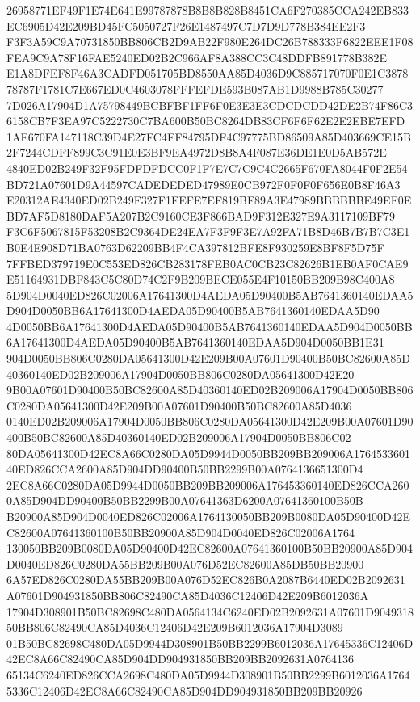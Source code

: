 \documentclass[UTF8,fontset=fandol,zihao=-4,a4paper]{ctexart}
\begin{document}
{{26958771EF49F1E74E641E99787878B8B8B828B8451CA6F270385CCA242EB833EC6905D42E209BD45FC5050727F26E1487497C7D7D9D778B384EE2F3
F3F3A59C9A70731850BB806CB2D9AB22F980E264DC26B788333F6822EEE1F08FEA9C9A78F16FAE5240ED02B2C966AF8A388CC3C48DDFB891778B382E
E1A8DFEF8F46A3CADFD051705BD8550AA85D4036D9C885717070F0E1C387878787F1781C7E667ED0C4603078FFFEFDE593B087AB1D9988B785C30277
7D026A17904D1A75798449BCBFBF1FF6F0E3E3E3CDCDCDD42DE2B74F86C36158CB7F3EA97C5222730C7BA600B50BC8264DB83CF6F6F62E2E2EBE7EFD
1AF670FA147118C39D4E27FC4EF84795DF4C97775BD86509A85D403669CE15B2F7244CDFF899C3C91E0E3BF9EA4972D8B8A4F087E36DE1E0D5AB572E
4840ED02B249F32F95FDFDFDCC0F1F7E7C7C9C4C2665F670FA8044F0F2E54BD721A07601D9A44597CADEDEDED47989E0CB972F0F0F0F656E0B8F46A3
E20312AE4340ED02B249F327F1FEFE7EF819BF89A3E47989BBBBBBE49EF0EBD7AF5D8180DAF5A207B2C9160CE3F866BAD9F312E327E9A3117109BF79
F3C6F5067815F53208B2C9364DE24EA7F3F9F3E7A92FA71B8D46B7B7B7C3E1B0E4E908D71BA0763D62209BB4F4CA397812BFE8F930259E8BF8F5D75F
7FFBED379719E0C553ED826CB283178FEB0AC0CB23C82626B1EB0AF0CAE9E51164931DBF843C5C80D74C2F9B209BECE055E4F10150BB209B98C400A8
5D904D0040ED826C02006A17641300D4AEDA05D90400B5AB7641360140EDAA5D904D0050BB6A17641300D4AEDA05D90400B5AB7641360140EDAA5D90
4D0050BB6A17641300D4AEDA05D90400B5AB7641360140EDAA5D904D0050BB6A17641300D4AEDA05D90400B5AB7641360140EDAA5D904D0050BB1E31
904D0050BB806C0280DA05641300D42E209B00A07601D90400B50BC82600A85D40360140ED02B209006A17904D0050BB806C0280DA05641300D42E20
9B00A07601D90400B50BC82600A85D40360140ED02B209006A17904D0050BB806C0280DA05641300D42E209B00A07601D90400B50BC82600A85D4036
0140ED02B209006A17904D0050BB806C0280DA05641300D42E209B00A07601D90400B50BC82600A85D40360140ED02B209006A17904D0050BB806C02
80DA05641300D42EC8A66C0280DA05D9944D0050BB209BB209006A176453360140ED826CCA2600A85D904DD90400B50BB2299B00A0764136651300D4
2EC8A66C0280DA05D9944D0050BB209BB209006A176453360140ED826CCA2600A85D904DD90400B50BB2299B00A07641363D6200A07641360100B50B
B20900A85D904D0040ED826C02006A1764130050BB209B0080DA05D90400D42EC82600A07641360100B50BB20900A85D904D0040ED826C02006A1764
130050BB209B0080DA05D90400D42EC82600A07641360100B50BB20900A85D904D0040ED826C0280DA55BB209B00A076D52EC82600A85DB50BB20900
6A57ED826C0280DA55BB209B00A076D52EC826B0A2087B6440ED02B2092631A07601D904931850BB806C82490CA85D4036C12406D42E209B6012036A
17904D308901B50BC82698C480DA0564134C6240ED02B2092631A07601D904931850BB806C82490CA85D4036C12406D42E209B6012036A17904D3089
01B50BC82698C480DA05D9944D308901B50BB2299B6012036A17645336C12406D42EC8A66C82490CA85D904DD904931850BB209BB2092631A0764136
65134C6240ED826CCA2698C480DA05D9944D308901B50BB2299B6012036A17645336C12406D42EC8A66C82490CA85D904DD904931850BB209BB20926
}}
\end{document}
